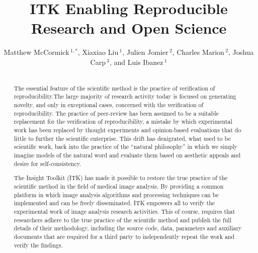 \documentclass{frontiersENG} %
\def\journal{Neuroinformatics}%
\def\firstAuthorLast{Sample {et~al.}} %
\def\Authors{Matthew McCormick\,$^{1,*}$,
  Xiaxiao Liu\,$^{1}$,
  Julien Jomier\,$^{2}$,
  Charles Marion\,$^{2}$,
  Joshua Carp\,$^{3}$,
  and Luis Ibanez\,$^1$}
\begin{document}
\onecolumn
{}

\title[ITK Reproducible Research]{ITK Enabling Reproducible Research and Open Science}
\author[\firstAuthorLast ]{\Authors}
\address{}
\correspondance{}
\extraAuth{}%

\maketitle
\begin{abstract}

\section{}
The essential feature of the scientific method is the practice of verification of reproducibility.The large majority of research activity today is focused on generating novelty, and only in exceptional cases, concerned with the verification of reproducibility. The practice of peer-review has been assumed to be a suitable replacement for the verification of reproducibility, a mistake by which experimental work has been replaced by thought experiments and opinion-based evaluations that do little to further the scientific enterprise. This drift has denigrated, what used to be scientific work, back into the practice of the “natural philosophy” in which we simply imagine models of the natural word and evaluate them based on aesthetic appeals and desire for self-consistency.

The Insight Toolkit (ITK) has made it possible to restore the true practice of the scientific method in the field of medical image analysis. By providing a common platform in which image analysis algorithms and processing techniques can be implemented and can be freely disseminated. ITK empowers all to verify the experimental work of image analysis research activities. This of course, requires that researchers adhere to the true practice of the scientific method and publish the full details of their methodology, including the source code, data, parameters and auxiliary documents that are required for a third party to independently repeat the work and verify the findings.


\end{abstract}
\end{document}
